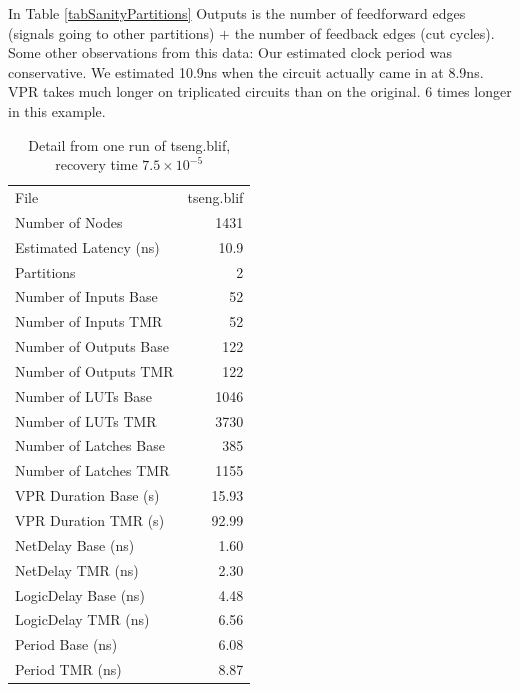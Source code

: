 \documentclass[12pt,final,oneside]{dwThesis} %
\begin{document}
    In Table \ref{tabSanityPartitions}
   Outputs is the number of feedforward edges (signals going to other
   partitions) $+$ the number of feedback edges (cut cycles).   Some other observations
   from this data: Our estimated clock period was conservative. We estimated
   10.9ns when the circuit actually came in at 8.9ns.  \gls{VPR} takes much
   longer on triplicated circuits than on the original. 6 times longer in this
   example.  
   \begin{table}

      \begin{tabular}
         {lr} \toprule File & tseng.blif\\

         Number of Nodes & 1431\\
         Estimated Latency (ns)& 10.9\\
         Partitions &
         2\\
         Number of Inputs Base & 52\\
         Number of Inputs TMR & 52\\
         Number of
         Outputs Base & 122\\
         Number of Outputs TMR & 122\\
         Number of LUTs Base
         & 1046\\
         Number of LUTs TMR & 3730\\
         Number of Latches Base & 385\\

         Number of Latches TMR & 1155\\
         VPR Duration Base (s) & 15.93\\
         VPR
         Duration TMR (s) & 92.99\\
         NetDelay Base (ns) & 1.60\\
         NetDelay TMR
         (ns) & 2.30\\
         LogicDelay Base (ns) & 4.48\\
         LogicDelay TMR (ns) &
         6.56\\
         Period Base (ns) & 6.08\\
         Period TMR (ns) & 8.87\\
         \bottomrule

      \end{tabular}
      \caption{Detail from one run of tseng.blif, recovery time
         $7.5\times10^{-5}$}\label{tabSanity} 
   \end{table}
\end{document}
